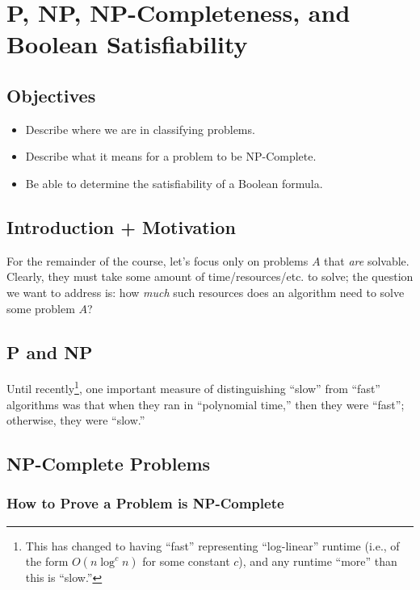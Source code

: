\chapter{P, NP, NP-Completeness, and Boolean Satisfiability}

\section{Objectives}

\begin{itemize}
	\item Describe where we are in classifying problems.
	\item Describe what it means for a problem to be NP-Complete.
	\item Be able to determine the satisfiability of a Boolean formula.
\end{itemize}

\section{Introduction + Motivation}

For the remainder of the course, let's focus only on problems $A$ that \emph{are} solvable.
Clearly, they must take some amount of time/resources/etc. to solve; the question we want to address is: how \emph{much} such resources does an algorithm need to solve some problem $A$?

\section{P and NP}

Until recently\footnote{This has changed to having ``fast'' representing ``log-linear'' runtime (i.e., of the form $O(n \log^c n)$ for some constant $c$), and any runtime ``more'' than this is ``slow.''}, one important measure of distinguishing ``slow'' from ``fast'' algorithms was that when they ran in ``polynomial time,'' then they were ``fast''; otherwise, they were ``slow.''

\section{NP-Complete Problems}

\subsection{How to Prove a Problem is NP-Complete}

